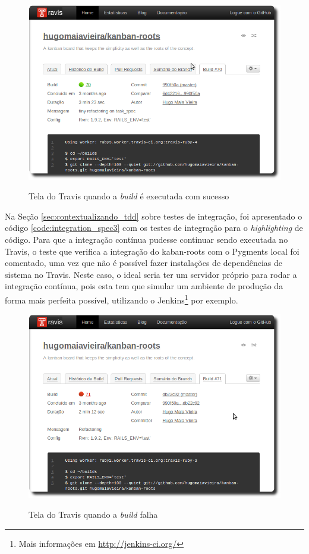 \begin{figure}[h]
  \center
  \caption{Tela do Travis quando a \textit{build} é executada com sucesso}
  \includegraphics[scale=0.55]{images/travis-success}
  \label{img:travis-success}
\end{figure}

Na Seção \ref{sec:contextualizando_tdd} sobre testes de integração, foi apresentado o código \ref{code:integration_spec3} com os testes de integração para o \textit{highlighting} de código. Para que a integração contínua pudesse continuar sendo executada no Travis, o teste que verifica a integração do kaban-roots com o Pygments local foi comentado, uma vez que não é possível fazer instalações de dependências de sistema no Travis. Neste caso, o ideal seria ter um servidor próprio para rodar a integração contínua, pois esta tem que simular um ambiente de produção da forma mais perfeita possível, utilizando o Jenkins\footnote{Mais informações em \url{http://jenkins-ci.org/}} por exemplo.

\begin{figure}[h]
  \center
  \caption{Tela do Travis quando a \textit{build} falha}
  \includegraphics[scale=0.55]{images/travis-fail}
  \label{img:travis-fail}
\end{figure}

